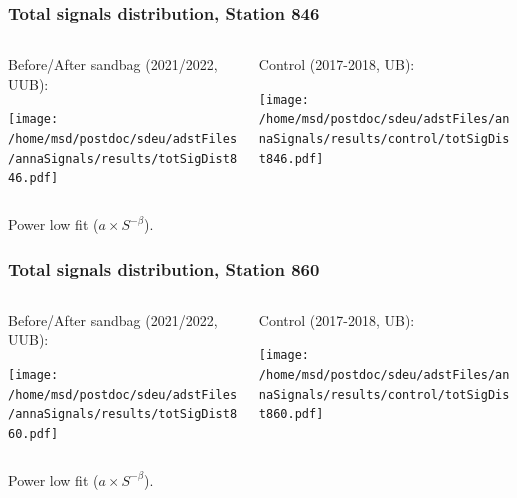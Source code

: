 \documentclass[aspectratio=169]{beamer}
\begin{document}
\begin{frame}
  \frametitle{Total signals distribution, Station 846}
  
  \begin{columns}[T,c]
    \begin{column}{.5\textwidth}
      Before/After sandbag (2021/2022, UUB):
      \vspace{.3cm}

      \texttt{[image: /home/msd/postdoc/sdeu/adstFiles/annaSignals/results/totSigDist846.pdf]}
    \end{column}
    \begin{column}{.5\textwidth}
      Control (2017-2018, UB):
      \vspace{0.3cm}

      \texttt{[image: /home/msd/postdoc/sdeu/adstFiles/annaSignals/results/control/totSigDist846.pdf]}
    \end{column}
  \end{columns}
  \vspace{0.5cm}

  Power low fit ($a\times S^{-\beta}$).
\end{frame}

\begin{frame}
  \frametitle{Total signals distribution, Station 860}
  
  \begin{columns}[T,c]
    \begin{column}{.5\textwidth}
      Before/After sandbag (2021/2022, UUB):
      \vspace{.3cm}

      \texttt{[image: /home/msd/postdoc/sdeu/adstFiles/annaSignals/results/totSigDist860.pdf]}
    \end{column}
    \begin{column}{.5\textwidth}
      Control (2017-2018, UB):
      \vspace{0.3cm}

      \texttt{[image: /home/msd/postdoc/sdeu/adstFiles/annaSignals/results/control/totSigDist860.pdf]}
    \end{column}
  \end{columns}
  \vspace{0.5cm}

  Power low fit ($a\times S^{-\beta}$).
\end{frame}
\end{document}
